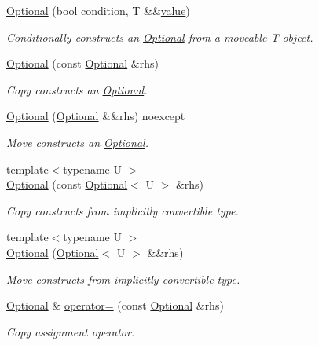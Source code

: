 \begin{DoxyCompactItemize}
\hyperlink{classmcurses_1_1Optional_a53b4829b1acfd54744d6dd8edb6dc2dc}{Optional} (bool condition, T \&\&\hyperlink{classmcurses_1_1Optional_ad366988d0311c9f6d4de369f222f248f}{value})
\begin{DoxyCompactList}\small\item\em Conditionally constructs an \hyperlink{classmcurses_1_1Optional}{Optional} from a moveable T object. \end{DoxyCompactList}\item 
\hyperlink{classmcurses_1_1Optional_a54206fd5a298d201a94fcbf869442169}{Optional} (const \hyperlink{classmcurses_1_1Optional}{Optional} \&rhs)
\begin{DoxyCompactList}\small\item\em Copy constructs an \hyperlink{classmcurses_1_1Optional}{Optional}. \end{DoxyCompactList}\item 
\hyperlink{classmcurses_1_1Optional_a4f9963abeb921ad1b51bbb176fe1e8fd}{Optional} (\hyperlink{classmcurses_1_1Optional}{Optional} \&\&rhs) noexcept
\begin{DoxyCompactList}\small\item\em Move constructs an \hyperlink{classmcurses_1_1Optional}{Optional}. \end{DoxyCompactList}\item 
{\footnotesize template$<$typename U $>$ }\\\hyperlink{classmcurses_1_1Optional_aa89d00c7dcd0b47c2b8fb5ac077795c4}{Optional} (const \hyperlink{classmcurses_1_1Optional}{Optional}$<$ U $>$ \&rhs)
\begin{DoxyCompactList}\small\item\em Copy constructs from implicitly convertible type. \end{DoxyCompactList}\item 
{\footnotesize template$<$typename U $>$ }\\\hyperlink{classmcurses_1_1Optional_a8818f33dbbe44f276c8ba36b83d4b4f6}{Optional} (\hyperlink{classmcurses_1_1Optional}{Optional}$<$ U $>$ \&\&rhs)
\begin{DoxyCompactList}\small\item\em Move constructs from implicitly convertible type. \end{DoxyCompactList}\item 
\hyperlink{classmcurses_1_1Optional}{Optional} \& \hyperlink{classmcurses_1_1Optional_ab76004970466959aaa1ae03255db9bf3}{operator=} (const \hyperlink{classmcurses_1_1Optional}{Optional} \&rhs)
\begin{DoxyCompactList}\small\item\em Copy assignment operator. \end{DoxyCompactList}\item 

\end{DoxyCompactItemize}

